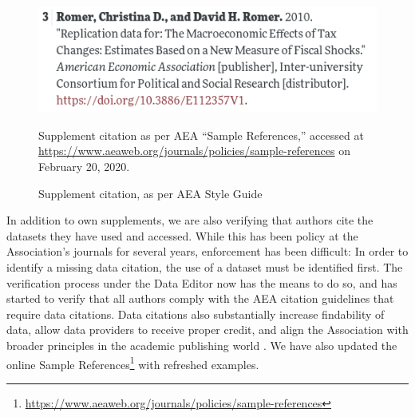 \documentclass[PP]{AEA}
\newcommand{\urlcite}[2]{#2\footnote{\url{#1}}}
\begin{document}
\begin{figure}
    \includegraphics[width=0.45\linewidth]{images/Screenshot_aer_data_citation.png}
    \caption{Supplement citation, as per AEA Style Guide\label{fig:citation}}
    \begin{minipage}{0.5\linewidth}
      \footnotesize  Supplement citation as per AEA ``Sample References,'' accessed at \url{https://www.aeaweb.org/journals/policies/sample-references} on February 20, 2020.
    \end{minipage}
\end{figure}

In addition to own supplements, we are also verifying that authors cite the datasets they have used and accessed. While this has been policy at the Association's journals for several years, enforcement has been difficult: In order to identify a missing data citation, the use of a dataset must be identified first. The verification process under the Data Editor now has the means to do so, and has started to verify that all authors comply with the AEA citation guidelines that require data citations. Data citations also substantially increase findability of data, allow data providers to receive proper credit, and align the Association with broader principles in the academic publishing world \citep{Altman2013-fl,dataone-cite,jddcp,CousijnSci.Data2018}. We have also updated the online  \urlcite{https://www.aeaweb.org/journals/policies/sample-references}{Sample References} with refreshed examples.
\end{document}
